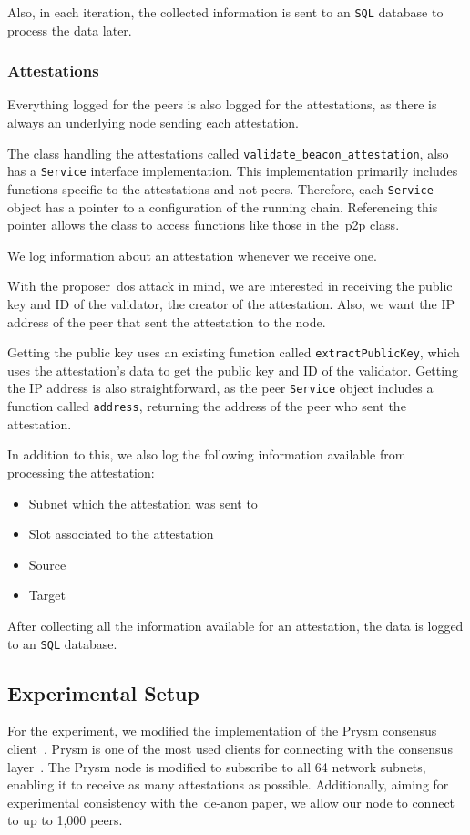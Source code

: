 Also, in each iteration, the collected information is sent to an \texttt{SQL} database to process the data later.

\subsubsection{Attestations}\label{subsubsec:attestations}
Everything logged for the peers is also logged for the attestations, as there is always an underlying node sending each attestation.

The class handling the attestations called \texttt{validate\_beacon\_attestation}, also has a \texttt{Service} interface implementation.
This implementation primarily includes functions specific to the attestations and not peers.
Therefore, each \texttt{Service} object has a pointer to a configuration of the running chain.
Referencing this pointer allows the class to access functions like those in the~\gls{p2p} class.

We log information about an attestation whenever we receive one.

With the proposer~\gls{dos} attack in mind, we are interested in receiving the public key and ID of the validator, the creator of the attestation.
Also, we want the IP address of the peer that sent the attestation to the node.

Getting the public key uses an existing function called \texttt{extractPublicKey}, which uses the attestation's data to get the public key and ID of the validator.
Getting the IP address is also straightforward, as the peer \texttt{Service} object includes a function called \texttt{address}, returning the address of the peer who sent the attestation.

In addition to this, we also log the following information available from processing the attestation:
\begin{itemize}
     \item Subnet which the attestation was sent to
     \item Slot associated to the attestation
     \item Source
     \item Target
\end{itemize}

After collecting all the information available for an attestation, the data is logged to an \texttt{SQL} database.

\subsection{Experimental Setup}\label{subsec:setup}
For the experiment, we modified the implementation of the Prysm consensus client~\cite{prysm}.
Prysm is one of the most used clients for connecting with the consensus layer~\cite{client-diversity}.
The Prysm node is modified to subscribe to all 64 network subnets, enabling it to receive as many attestations as possible.
Additionally, aiming for experimental consistency with the~\gls{de-anon paper}, we allow our node to connect to up to 1,000 peers.


